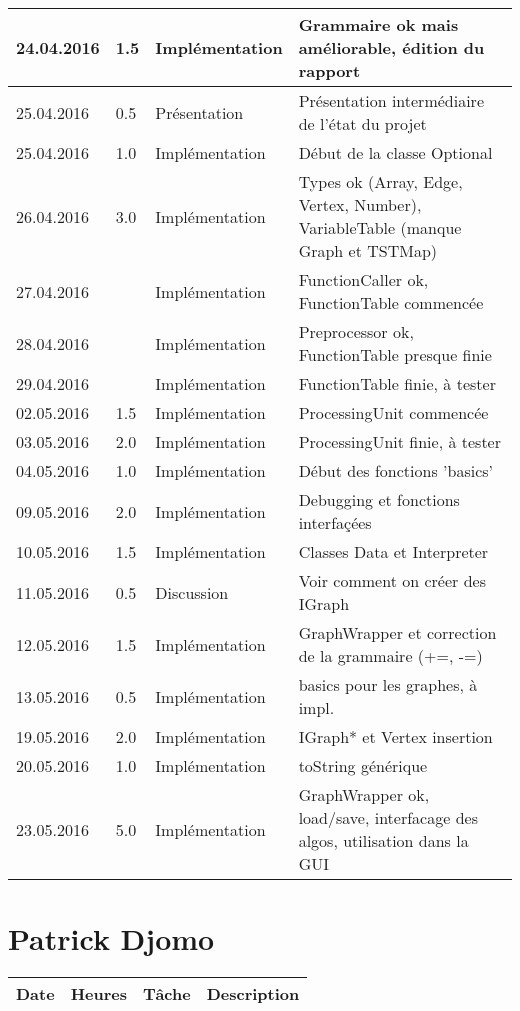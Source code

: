 \documentclass[french]{article}
\begin{document}
\begin{tabular}{p{}|p{}|p{}|p{}}
		24.04.2016 & 1.5 & Implémentation & Grammaire ok mais améliorable, édition du rapport\\ 
		\hline
		25.04.2016 & 0.5 & Présentation & Présentation intermédiaire de l'état du projet\\
		25.04.2016 & 1.0 & Implémentation & Début de la classe Optional\\
		26.04.2016 & 3.0 & Implémentation & Types ok (Array, Edge, Vertex, Number), VariableTable (manque Graph et TSTMap)\\
		27.04.2016 & & Implémentation & FunctionCaller ok, FunctionTable commencée\\
		28.04.2016 & & Implémentation & Preprocessor ok, FunctionTable presque finie\\
		29.04.2016 & & Implémentation & FunctionTable finie, à tester\\
		\hline
		02.05.2016 & 1.5 & Implémentation & ProcessingUnit commencée\\
		03.05.2016 & 2.0 & Implémentation & ProcessingUnit finie, à tester\\
		04.05.2016 & 1.0 & Implémentation & Début des fonctions 'basics'\\
		\hline 
		09.05.2016 & 2.0 & Implémentation & Debugging et fonctions interfaçées\\
		10.05.2016 & 1.5 & Implémentation & Classes Data et Interpreter\\
		11.05.2016 & 0.5 & Discussion & Voir comment on créer des IGraph\\
		12.05.2016 & 1.5 & Implémentation & GraphWrapper et correction de la grammaire (+=, -=)\\
		13.05.2016 & 0.5 & Implémentation & basics pour les graphes, à impl.\\
		\hline
		19.05.2016 & 2.0 & Implémentation & IGraph* et Vertex insertion\\
		20.05.2016 & 1.0 & Implémentation & toString générique\\
		\hline
		23.05.2016 & 5.0 & Implémentation & GraphWrapper ok, load/save, interfacage des algos, utilisation dans la GUI\\
	\end{tabular}
	
	\section*{Patrick Djomo}
	\begin{tabular}{p{}|p{}|p{}|p{}}
		Date&Heures&Tâche&Description\\
		\hline
	\end{tabular}
	
\end{document}
